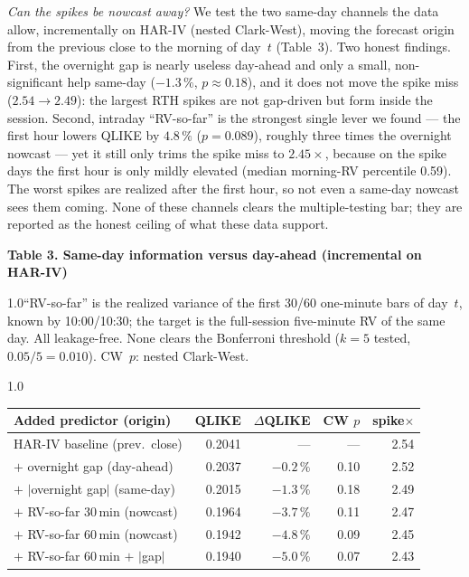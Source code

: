 \documentclass[12pt,a4paper]{article}
\newcommand{\tnote}[1]{\par\vspace{1.2ex}\begin{spacing}{1.0}\small\noindent #1\par\end{spacing}\vspace{1.2ex}}
\begin{document}
\emph{Can the spikes be nowcast away?} We test the two same-day channels the data allow, incrementally
on HAR-IV (nested Clark-West), moving the forecast origin from the previous close to the morning of
day~$t$ (Table~3). Two honest findings. First, the overnight gap is nearly useless
day-ahead and only a small, non-significant help same-day ($-1.3\,\%$, $p\approx0.18$), and it does
not move the spike miss ($2.54\to2.49$): the largest RTH spikes are not gap-driven but form inside the
session. Second, intraday ``RV-so-far'' is the strongest single lever we found --- the first hour
lowers QLIKE by $4.8\,\%$ ($p=0.089$), roughly three times the overnight nowcast --- yet it still only
trims the spike miss to $2.45\times$, because on the spike days the first hour is only mildly elevated
(median morning-RV percentile 0.59). The worst spikes are realized after the first hour, so not even a
same-day nowcast sees them coming. None of these channels clears the multiple-testing bar; they are
reported as the honest ceiling of what these data support.

\begin{table}[t]\centering
\textbf{Table 3. Same-day information versus day-ahead (incremental on HAR-IV)}
\tnote{``RV-so-far'' is the realized variance of the first 30/60 one-minute bars of day~$t$, known by
10:00/10:30; the target is the full-session five-minute RV of the same day. All leakage-free. None
clears the Bonferroni threshold ($k=5$ tested, $0.05/5=0.010$). CW~$p$: nested Clark-West.}
\begin{spacing}{1.0}
\begin{tabular}{lrrrr}
\toprule
Added predictor (origin) & QLIKE & $\Delta$QLIKE & CW $p$ & spike$\times$ \\
\midrule
HAR-IV baseline (prev.\ close)          & 0.2041 & ---      & ---   & 2.54 \\
$+$ overnight gap (day-ahead)           & 0.2037 & $-0.2\,\%$ & 0.10 & 2.52 \\
$+$ $|$overnight gap$|$ (same-day)      & 0.2015 & $-1.3\,\%$ & 0.18 & 2.49 \\
$+$ RV-so-far 30\,min (nowcast)         & 0.1964 & $-3.7\,\%$ & 0.11 & 2.47 \\
$+$ RV-so-far 60\,min (nowcast)         & 0.1942 & $\mathbf{-4.8\,\%}$ & 0.09 & 2.45 \\
$+$ RV-so-far 60\,min $+$ $|$gap$|$     & 0.1940 & $-5.0\,\%$ & 0.07 & 2.43 \\
\bottomrule
\end{tabular}
\end{spacing}
\label{tab:nowcast}
\end{table}
\end{document}
